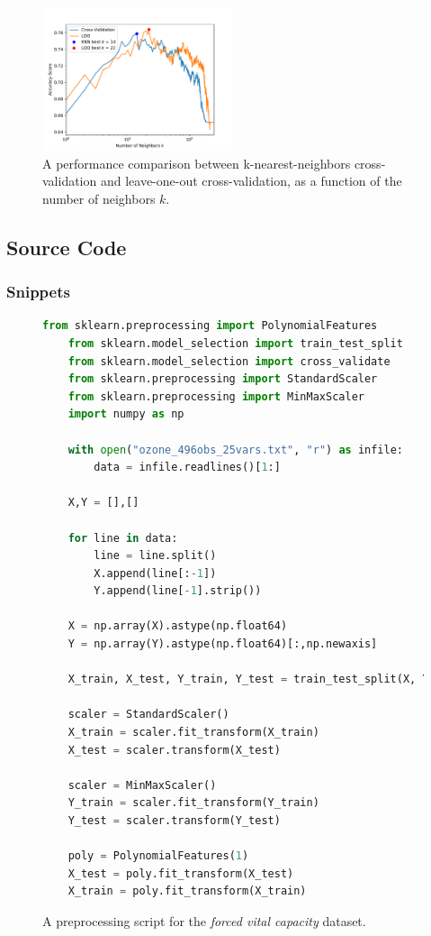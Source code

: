 \documentclass[twoside,twocolumn,10pt]{revtex4-1}
\begin{document}
	\begin{figure}[H]
	\centering  
	\includegraphics[width = 0.5\textwidth]{plot_2.pdf}
	\caption{A performance comparison between k-nearest-neighbors cross-validation and leave-one-out cross-validation, as a function of the number of neighbors $k$.\label{fig_2}}
	\end{figure}
	
	\subsection{Source Code}
	
	\subsubsection{Snippets}
	
	\begin{figure}[H]
	\begin{lstlisting}[showstringspaces=false,language=Python,numbers=none]
	from sklearn.preprocessing import PolynomialFeatures
	from sklearn.model_selection import train_test_split
	from sklearn.model_selection import cross_validate
	from sklearn.preprocessing import StandardScaler
	from sklearn.preprocessing import MinMaxScaler
	import numpy as np
	
	with open("ozone_496obs_25vars.txt", "r") as infile:
	    data = infile.readlines()[1:]
	
	X,Y = [],[]
	
	for line in data:
	    line = line.split()
	    X.append(line[:-1])
	    Y.append(line[-1].strip())
	
	X = np.array(X).astype(np.float64)
	Y = np.array(Y).astype(np.float64)[:,np.newaxis]
	
	X_train, X_test, Y_train, Y_test = train_test_split(X, Y, test_size = 0.5)
	
	scaler = StandardScaler()
	X_train = scaler.fit_transform(X_train)
	X_test = scaler.transform(X_test)
	
	scaler = MinMaxScaler()
	Y_train = scaler.fit_transform(Y_train)
	Y_test = scaler.transform(Y_test)
	
	poly = PolynomialFeatures(1)
	X_test = poly.fit_transform(X_test)
	X_train = poly.fit_transform(X_train)
	\end{lstlisting}
	\caption{A preprocessing script for the \textit{forced vital capacity} dataset.\label{code_0}}
	\end{figure}
	
\end{document}
